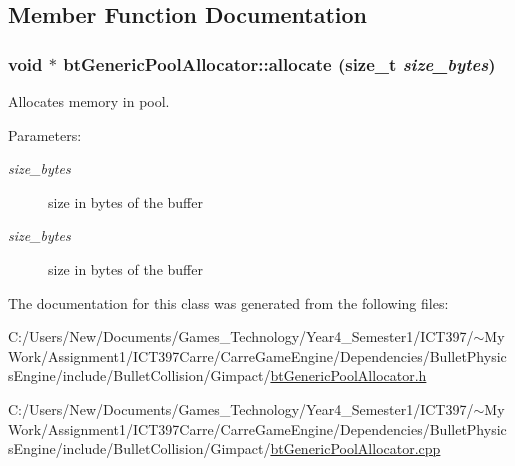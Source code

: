 \subsection{Member Function Documentation}
\hypertarget{classbt_generic_pool_allocator_e07307fd61ffa9ce47b5f198b87d17e1}{
\subsubsection[allocate]{\setlength{\rightskip}{0pt plus 5cm}void $\ast$ btGenericPoolAllocator::allocate (size\_\-t {\em size\_\-bytes})}}
\label{classbt_generic_pool_allocator_e07307fd61ffa9ce47b5f198b87d17e1}


Allocates memory in pool. 

\begin{Desc}
\item[Parameters:]
\begin{description}
\item[{\em size\_\-bytes}]size in bytes of the buffer\item[{\em size\_\-bytes}]size in bytes of the buffer \end{description}
\end{Desc}


The documentation for this class was generated from the following files:\begin{CompactItemize}
\item 
C:/Users/New/Documents/Games\_\-Technology/Year4\_\-Semester1/ICT397/$\sim$My Work/Assignment1/ICT397Carre/CarreGameEngine/Dependencies/BulletPhysicsEngine/include/BulletCollision/Gimpact/\hyperlink{bt_generic_pool_allocator_8h}{btGenericPoolAllocator.h}\item 
C:/Users/New/Documents/Games\_\-Technology/Year4\_\-Semester1/ICT397/$\sim$My Work/Assignment1/ICT397Carre/CarreGameEngine/Dependencies/BulletPhysicsEngine/include/BulletCollision/Gimpact/\hyperlink{bt_generic_pool_allocator_8cpp}{btGenericPoolAllocator.cpp}\end{CompactItemize}
